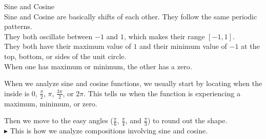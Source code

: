 \documentclass{ximera}
\begin{document}
\begin{example}
\begin{explanation}
\begin{image}
\end{image}







\end{explanation}


\end{example}






\begin{summary} Sine and Cosine \\


Sine and Cosine are basically shifts of each other.  They follow the same periodic patterns. \\

They both oscillate between $-1$ and $1$, which makes their range $[-1,1]$. \\

They both have their maximum value of $1$ and their minimum value of $-1$ at the top, bottom, or sides of the unit circle. \\

When one has maximum or minimum, the other has a zero. \\

\end{summary}


When we analyze sine and cosine functions, we usually start by locating when the inside is $0$, $\frac{\pi}{2}$, $\pi$, $\frac{3\pi}{2}$, or $2\pi$.  This tells us when the function is experiencing a maximum, minimum, or zero.

Then we move to the easy angles ($\frac{\pi}{6}$, $\frac{\pi}{4}$, and $\frac{\pi}{3}$) to round out the shape. \\





\textbf{\textcolor{red!80!black}{$\blacktriangleright$}} This is how we analyze compositions involving sine and cosine.
\end{document}
